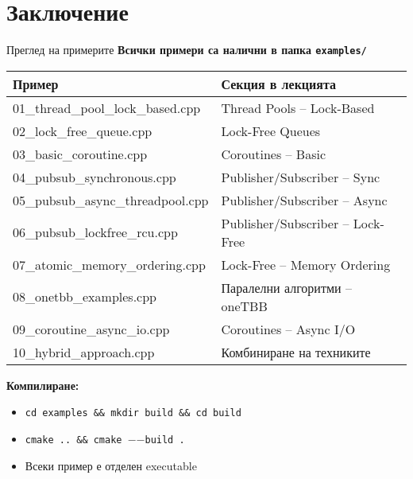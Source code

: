 \documentclass[aspectratio=169]{beamer}
\begin{document}
\section{Заключение}

\begin{frame}{Преглед на примерите}
\textbf{Всички примери са налични в папка \texttt{examples/}}

\begin{table}
\centering
\footnotesize
\begin{tabular}{|l|l|}
\hline
\textbf{Пример} & \textbf{Секция в лекцията} \\
\hline
01\_thread\_pool\_lock\_based.cpp & Thread Pools – Lock-Based \\
02\_lock\_free\_queue.cpp & Lock-Free Queues \\
03\_basic\_coroutine.cpp & Coroutines – Basic \\
04\_pubsub\_synchronous.cpp & Publisher/Subscriber – Sync \\
05\_pubsub\_async\_threadpool.cpp & Publisher/Subscriber – Async \\
06\_pubsub\_lockfree\_rcu.cpp & Publisher/Subscriber – Lock-Free \\
07\_atomic\_memory\_ordering.cpp & Lock-Free – Memory Ordering \\
08\_onetbb\_examples.cpp & Паралелни алгоритми – oneTBB \\
09\_coroutine\_async\_io.cpp & Coroutines – Async I/O \\
10\_hybrid\_approach.cpp & Комбиниране на техниките \\
\hline
\end{tabular}
\end{table}

\vspace{0.3cm}
\textbf{Компилиране:}
\begin{itemize}
    \item \texttt{cd examples \&\& mkdir build \&\& cd build}
    \item \texttt{cmake .. \&\& cmake $-$$-$build .}
    \item Всеки пример е отделен executable
\end{itemize}
\end{frame}
\end{document}
